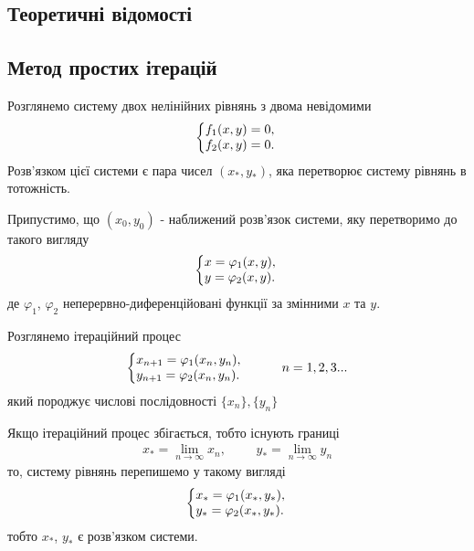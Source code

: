 \documentclass{article}
\begin{document}
\begin{large}
		\section*{Теоретичні відомості}
		\subsection*{Метод простих ітерацій}
		Розглянемо систему двох нелінійних рівнянь з двома невідомими
		\begin{gather}
			\left\{\begin{array}{@{}l@{}}
				f_1(x, y)=0,\\\nonumber
				f_2(x,y)=0.\nonumber
			\end{array}\right.\,
		\end{gather}
		Розв’язком цієї системи є пара чисел $(x_*,y_*)$, яка перетворює систему рівнянь в тотожність.
		
		Припустимо, що $(x_0, y_0)$ - наближений розв’язок системи, яку
		перетворимо до такого вигляду
		\begin{gather}
			\left\{\begin{array}{@{}l@{}}
				x=\varphi_1(x, y),\\\nonumber
				y=\varphi_2(x,y).\nonumber
			\end{array}\right.\,
		\end{gather}
		де $\varphi_1$, $\varphi_2$ неперервно-диференційовані функції за змінними $x$ та $y$.
		
		Розглянемо ітераційний процес
		\begin{gather}\nonumber
			\left\{\begin{array}{@{}l@{}}
				x_{n+1}=\varphi_1(x_n, y_n),\\\nonumber
				y_{n+1}=\varphi_2(x_n,y_n).\nonumber
			\end{array}\right.\,
			\hspace{28pt}
			n=1,2,3...
		\end{gather}
		який породжує числові послідовності $\{x_n\}, \{y_n\}$
		
		Якщо ітераційний процес збігається, тобто існують границі
		\begin{gather}
			x_* = \lim_{n\rightarrow\infty}x_n,
			\hspace{28pt}
			y_* = \lim_{n\rightarrow\infty}y_n\nonumber
		\end{gather}
		то, систему рівнянь перепишемо у такому	вигляді
		\begin{gather}
			\left\{\begin{array}{@{}l@{}}
				x_*=\varphi_1(x_*, y_*),\\\nonumber
				y_*=\varphi_2(x_*,y_*).\nonumber
			\end{array}\right.\,
		\end{gather}
		тобто $x_*$, $y_*$ є розв’язком системи.

\end{large}
\end{document}
